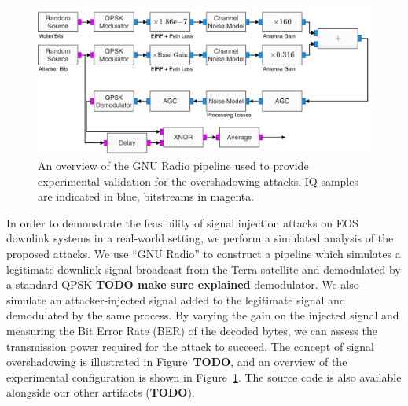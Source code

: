 \begin{figure}
    \centering
    \includegraphics[width=\columnwidth]{diagrams/overshadowing_pipeline.pdf}
    \caption{An overview of the GNU Radio pipeline used to provide experimental validation for the overshadowing attacks. IQ samples are indicated in blue, bitstreams in magenta.}
    \label{fig:overshadowing_pipeline}
\end{figure}

In order to demonstrate the feasibility of signal injection attacks on EOS downlink systems in a real-world setting, we perform a simulated analysis of the proposed attacks.
We use ``GNU Radio'' to construct a pipeline which simulates a legitimate downlink signal broadcast from the Terra satellite and demodulated by a standard QPSK \textbf{TODO make sure explained} demodulator.
We also simulate an attacker-injected signal added to the legitimate signal and demodulated by the same process.
By varying the gain on the injected signal and measuring the Bit Error Rate (BER) of the decoded bytes, we can assess the transmission power required for the attack to succeed.
The concept of signal overshadowing is illustrated in Figure~\textbf{TODO}, and an overview of the experimental configuration is shown in Figure~\ref{fig:overshadowing_pipeline}.
The source code is also available alongside our other artifacts (\textbf{TODO}).

